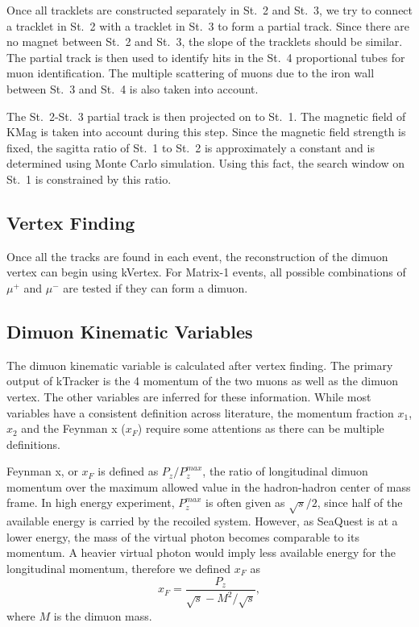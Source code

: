 \documentclass[../main.tex]{subfiles}
\begin{document}
Once all tracklets are constructed separately in St.~2 and St.~3, we try to connect a tracklet
in St.~2 with a tracklet in St.~3 to form a partial track. Since there are no magnet between
St.~2 and St.~3, the slope of the tracklets should be similar. The partial track is then used to
identify hits in the St.~4 proportional tubes for muon identification. The multiple scattering of
muons due to the iron wall between St.~3 and St.~4 is also taken into account.

The St.~2-St.~3 partial track is then projected on to St.~1. The magnetic field of KMag is taken into
account during this step. Since the magnetic field strength is fixed, the sagitta ratio of St.~1 to
St.~2 is approximately a constant and is determined using Monte Carlo simulation. Using this fact,
the search window on St.~1 is constrained by this ratio.


\subsection{Vertex Finding}
Once all the tracks are found in each event, the reconstruction of the dimuon vertex can begin using kVertex.
For Matrix-1 events, all possible combinations of $\mu^+$ and $\mu^-$ are tested if they can form
a dimuon.


\subsection{Dimuon Kinematic Variables}
\label{subsec:def_kinematic}
The dimuon kinematic variable is calculated after vertex finding. The primary output of kTracker
is the 4 momentum of the two muons as well as the dimuon vertex. The other variables are inferred 
for these information. While most variables have a consistent definition across literature, the momentum
fraction $x_1$, $x_2$ and the Feynman x ($x_F$) require some attentions as there can be multiple definitions.

Feynman x, or $x_F$ is defined as $P_z/P_z^{max}$, the ratio of longitudinal dimuon momentum
over the maximum allowed value in the hadron-hadron center of mass frame. In high energy
experiment, $P_z^{max}$ is often given as $\sqrt{s}/2$, since half of the available energy is
carried by the recoiled system.
However, as SeaQuest is at a lower energy, the mass of the virtual photon becomes comparable to its momentum.
A heavier virtual photon would imply less available energy for the longitudinal momentum,
therefore we defined $x_F$ as 
\begin{equation}
	x_F = \frac{P_z}{\sqrt{s}-M^2/\sqrt{s}},
\end{equation}
where $M$ is the dimuon mass.
\end{document}
